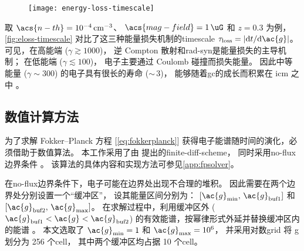 \begin{figure}[htp]
  \centering
  \texttt{[image: energy-loss-timescale]}
  \label{fig:eloss-timescale}
\end{figure}

取 $\acs{n-th} = \SI{e-4}{\per\cubic\cm}$、
$\acs{mag-field} = \SI{1}{\uG}$ 和 $z = 0.3$ 为例，
\autoref{fig:eloss-timescale} 对比了这三种能量损失机制的\ac{timescale}
$\tau_{\R{loss}} = |\D{t}/\D{\ac{g}}|$。
可见，在高能端 ($\gamma \gtrsim 1000$)，
逆 Compton 散射和\ac{rad-syn}是能量损失的主导机制；
在低能端 ($\gamma \lesssim 100$)，
电子主要通过 Coulomb 碰撞而损失能量。
因此中等能量 ($\gamma \sim 300$) 的电子具有很长的寿命 ($\sim$\,\SI{3}{\Gyr})，
能够随着\ac{gc}的成长而积累在 \ac{icm} 之中 \cite{sarazin1999}。

\subsection{数值计算方法}
\label{sec:numerical}

为了求解 Fokker--Planck 方程 [\autoref{eq:fokkerplanck}]
获得电子能谱随时间的演化，必须借助于数值算法。
本工作采用了由  提出的\ac{finite-diff-scheme}，
同时采用\ac{no-flux}边界条件 \cite{park1996}。
该算法的具体内容和实现方法可参见\autoref{app:fpsolver}。

在\ac{no-flux}边界条件下，电子可能在边界处出现不合理的堆积。
因此需要在两个边界处分别设置一个\enquote{缓冲区}，
设其能量区间分别为：
$[\ac{g}_{\R{min}}, \,\ac{g}_{\R{buf1}}]$ 和
$[\ac{g}_{\R{buf2}}, \,\ac{g}_{\R{max}}]$。
在求解过程中，利用缓冲区外 ($\ac{g}_{\R{buf1}} < \ac{g} < \ac{g}_{\R{buf2}}$)
的有效能谱，按幂律形式外延并替换缓冲区内的能谱 \cite{borovsky1986,donnert2014}。
本文选取了 $\ac{g}_{\R{min}} = 1$ 和 $\ac{g}_{\R{max}} = \num{e6}$，
并采用对数\ac{grid} 将 \ac{g} 划分为 256 个\ac{cell}，
其中两个缓冲区均占据 10 个\ac{cell}。

